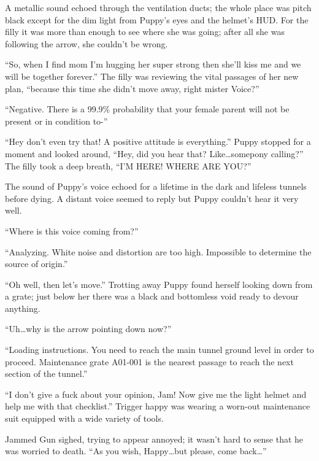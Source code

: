 \horizonline


A metallic sound echoed through the ventilation ducts; the whole place was pitch black except for the dim light from Puppy's eyes and the helmet's HUD. For the filly it was more than enough to see where she was going; after all she was following the arrow, she couldn't be wrong.

``So, when I find mom I'm hugging her super strong then she'll kiss me and we will be together forever.'' The filly was reviewing the vital passages of her new plan, ``because this time she didn't move away, right mister Voice?''

``{\mt Negative. There is a 99.9\% probability that your female parent will not be present or in condition to-}''

``Hey don't even try that! A positive attitude is everything.'' Puppy stopped for a moment and looked around, ``Hey, did you hear that? Like\dots somepony calling?'' The filly took a deep breath, ``I'M HERE! WHERE ARE YOU?''

The sound of Puppy's voice echoed for a lifetime in the dark and lifeless tunnels before dying. A distant voice seemed to reply but Puppy couldn't hear it very well.

``Where is this voice coming from?''

``{\mt Analyzing. White noise and distortion are too high. Impossible to determine the source of origin.}''

``Oh well, then let's move.'' Trotting away Puppy found herself looking down from a grate; just below her there was a black and bottomless void ready to devour anything.

``Uh\dots why is the arrow pointing down now?''

``{\mt Loading instructions. You need to reach the main tunnel ground level in order to proceed. Maintenance grate A01-001 is the nearest passage to reach the next section of the tunnel.}''

\horizonline


``I don't give a fuck about your opinion, Jam! Now give me the light helmet and help me with that checklist.'' Trigger happy was wearing a worn-out maintenance suit equipped with a wide variety of tools.

Jammed Gun sighed, trying to appear annoyed; it wasn't hard to sense that he was worried to death. ``As you wish, Happy\dots but please, come back\dots''

